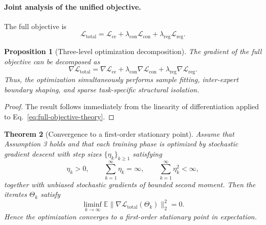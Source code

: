 \documentclass[journal]{IEEEtran}
\theoremstyle{plain}
\newtheorem{theorem}{Theorem}[section]
\newtheorem{proposition}[theorem]{Proposition}
\theoremstyle{definition}
\theoremstyle{remark}
\begin{document}
\paragraph{Joint analysis of the unified objective.}
The full objective is
\begin{equation}
\mathcal{L}_{\mathrm{total}}
=
\mathcal{L}_{\mathrm{ce}}
+
\lambda_{\mathrm{con}}\mathcal{L}_{\mathrm{con}}
+
\lambda_{\mathrm{reg}}\mathcal{L}_{\mathrm{reg}}.
\label{eq:full-objective-theory}
\end{equation}

\begin{proposition}[Three-level optimization decomposition]
\label{prop:gradient-decomp}
The gradient of the full objective can be decomposed as
\begin{equation}
\nabla \mathcal{L}_{\mathrm{total}}
=
\nabla \mathcal{L}_{\mathrm{ce}}
+
\lambda_{\mathrm{con}}\nabla \mathcal{L}_{\mathrm{con}}
+
\lambda_{\mathrm{reg}}\nabla \mathcal{L}_{\mathrm{reg}}.
\label{eq:gradient-decomposition}
\end{equation}
Thus, the optimization simultaneously performs sample fitting, inter-expert boundary shaping, and sparse task-specific structural isolation.
\end{proposition}

\begin{proof}
The result follows immediately from the linearity of differentiation applied to Eq.~\eqref{eq:full-objective-theory}.
\end{proof}

\begin{theorem}[Convergence to a first-order stationary point]
\label{thm:stationary-point}
Assume that Assumption 3 holds and that each training phase is optimized by stochastic gradient descent with step sizes $\{\eta_k\}_{k\ge 1}$ satisfying
\begin{equation}
\eta_k>0,\qquad \sum_{k=1}^{\infty}\eta_k=\infty,\qquad \sum_{k=1}^{\infty}\eta_k^2<\infty,
\label{eq:sgd-conditions}
\end{equation}
together with unbiased stochastic gradients of bounded second moment. Then the iterates $\Theta_k$ satisfy
\begin{equation}
\liminf_{k\to\infty}\mathbb{E}\|\nabla \mathcal{L}_{\mathrm{total}}(\Theta_k)\|_2^2=0.
\label{eq:stationary-result}
\end{equation}
Hence the optimization converges to a first-order stationary point in expectation.
\end{theorem}
\end{document}
